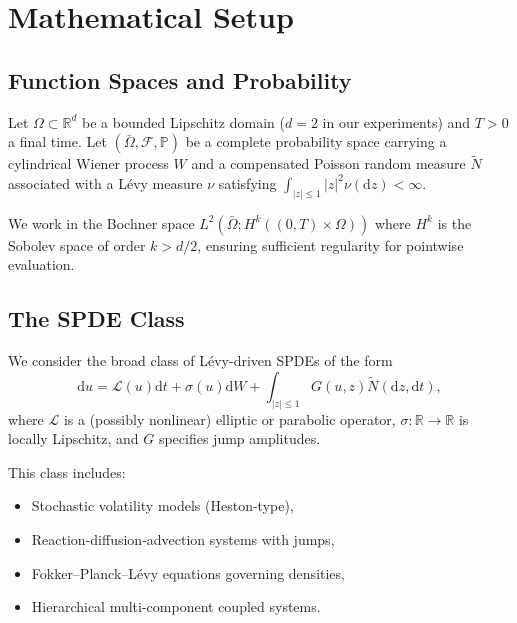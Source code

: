 \documentclass[times,12pt]{elsarticle}
\newcommand{\bbR}{\mathbb{R}}
\newcommand{\bbP}{\mathbb{P}}
\newcommand{\abs}[1]{\left|#1\right|}
\newcommand{\diff}{\mathrm{d}}
\begin{document}

\section{Mathematical Setup}
\label{sec:setup}


\subsection{Function Spaces and Probability}

Let $\Omega \subset \bbR^d$ be a bounded Lipschitz domain ($d=2$ in our experiments) and $T > 0$ a final time. Let $(\bar{\Omega}, \mathcal{F}, \bbP)$ be a complete probability space carrying a cylindrical Wiener process $W$ and a compensated Poisson random measure $\widetilde{N}$ associated with a L\'evy measure $\nu$ satisfying $\int_{\abs{z} \leq 1} \abs{z}^2 \nu(\diff z) < \infty$.

We work in the Bochner space $L^2(\bar{\Omega}; H^k((0,T) \times \Omega))$ where $H^k$ is the Sobolev space of order $k > d/2$, ensuring sufficient regularity for pointwise evaluation.

\subsection{The SPDE Class}

We consider the broad class of L\'evy-driven SPDEs of the form
\begin{equation}
\diff u = \mathcal{L}(u) \diff t + \sigma(u) \diff W + \int_{\abs{z} \leq 1} G(u, z) \widetilde{N}(\diff z, \diff t),
\label{eq:general-spde}
\end{equation}
where $\mathcal{L}$ is a (possibly nonlinear) elliptic or parabolic operator, $\sigma : \bbR \to \bbR$ is locally Lipschitz, and $G$ specifies jump amplitudes.

This class includes:
\begin{itemize}
    \item Stochastic volatility models (Heston-type),
    \item Reaction-diffusion-advection systems with jumps,
    \item Fokker--Planck--L\'evy equations governing densities,
    \item Hierarchical multi-component coupled systems.
\end{itemize}
\end{document}
